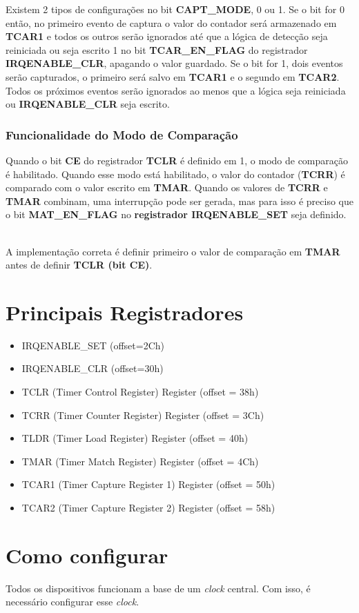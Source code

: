 \documentclass[12pt]{article}
\begin{document}
			Existem 2 tipos de configurações no bit \textbf{CAPT\_MODE}, 0 ou 1. Se o bit for 0 então, no primeiro evento de captura o valor do contador será armazenado em \textbf{TCAR1} e todos os outros serão ignorados até que a lógica de detecção seja reiniciada ou seja escrito 1 no bit \textbf{TCAR\_EN\_FLAG} do registrador \textbf{IRQENABLE\_CLR}, apagando o valor guardado. Se o bit for 1, dois eventos serão capturados, o primeiro será salvo em \textbf{TCAR1} e o segundo em \textbf{TCAR2}. Todos os próximos eventos serão ignorados ao menos que a lógica seja reiniciada ou \textbf{IRQENABLE\_CLR} seja escrito. 
		\subsubsection{Funcionalidade do Modo de Comparação}
			Quando o bit \textbf{CE} do registrador \textbf{TCLR} é definido em 1, o modo de comparação é habilitado. Quando esse modo está habilitado, o valor do contador (\textbf{TCRR}) é comparado com o valor escrito em \textbf{TMAR}. Quando os valores de \textbf{TCRR} e \textbf{TMAR} combinam, uma interrupção pode ser gerada, mas para isso é preciso que o bit \textbf{MAT\_EN\_FLAG} no \textbf{registrador IRQENABLE\_SET} seja definido. \
			
			A implementação correta é definir primeiro o valor de comparação em \textbf{TMAR} antes de definir \textbf{TCLR (bit CE)}.
	\section{Principais Registradores}
		\begin{itemize}
			\item IRQENABLE\_SET (offset=2Ch)
			\item IRQENABLE\_CLR (offset=30h)
			\item TCLR (Timer Control Register) Register (offset = 38h)
			\item TCRR (Timer Counter Register) Register (offset = 3Ch)
			\item TLDR (Timer Load Register) Register (offset = 40h)
			\item TMAR (Timer Match Register) Register (offset = 4Ch)
			\item TCAR1 (Timer Capture Register 1) Register (offset = 50h)
			\item TCAR2 (Timer Capture Register 2) Register (offset = 58h)
		\end{itemize}
	\section{Como configurar}
		Todos os dispositivos funcionam a base de um \textit{clock} central. Com isso, é necessário configurar esse \textit{clock}. \
		
\end{document}
